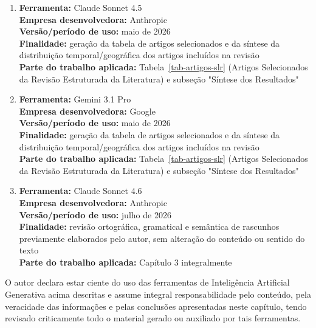 \begin{enumerate}
    \item \textbf{Ferramenta:} Claude Sonnet 4.5 \\
    \textbf{Empresa desenvolvedora:} Anthropic \\
    \textbf{Versão/período de uso:} maio de 2026 \\
    \textbf{Finalidade:} geração da tabela de artigos selecionados e da síntese da distribuição temporal/geográfica dos artigos incluídos na revisão \\
    \textbf{Parte do trabalho aplicada:} Tabela~\ref{tab-artigos-slr} (Artigos Selecionados da Revisão Estruturada da Literatura) e subseção "Síntese dos Resultados"

    \item \textbf{Ferramenta:} Gemini 3.1 Pro \\
    \textbf{Empresa desenvolvedora:} Google \\
    \textbf{Versão/período de uso:} maio de 2026 \\
    \textbf{Finalidade:} geração da tabela de artigos selecionados e da síntese da distribuição temporal/geográfica dos artigos incluídos na revisão \\
    \textbf{Parte do trabalho aplicada:} Tabela~\ref{tab-artigos-slr} (Artigos Selecionados da Revisão Estruturada da Literatura) e subseção "Síntese dos Resultados"

    \item \textbf{Ferramenta:} Claude Sonnet 4.6 \\
    \textbf{Empresa desenvolvedora:} Anthropic \\
    \textbf{Versão/período de uso:} julho de 2026 \\
    \textbf{Finalidade:} revisão ortográfica, gramatical e semântica de rascunhos previamente elaborados pelo autor, sem alteração do conteúdo ou sentido do texto \\
    \textbf{Parte do trabalho aplicada:} Capítulo 3 integralmente
\end{enumerate}

O autor declara estar ciente do uso das ferramentas de Inteligência Artificial Generativa acima descritas e assume integral responsabilidade pelo conteúdo, pela veracidade das informações e pelas conclusões apresentadas neste capítulo, tendo revisado criticamente todo o material gerado ou auxiliado por tais ferramentas.